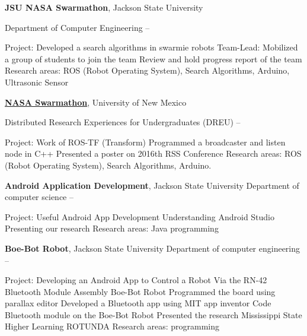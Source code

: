 \documentclass[letterpaper,10pt,oneside]{article}
\begin{document}
\begin{body}
{\textbf{ JSU NASA Swarmathon}}, Jackson State University

\GapNoBreak
\BulletItem
Department of Computer Engineering
\hfill
{} --
\begin{detail}
\SubBulletItem
Project:
Developed a search algorithms in swarmie robots
\SubBulletItem
Team-Lead: Mobilized a group of students to join the team
\SubBulletItem
Review and hold progress report of the team
\SubBulletItem
Research areas:
ROS (Robot Operating System), Search Algorithms, Arduino, Ultrasonic Sensor
\end{detail}

\href{http://nasaswarmathon.com/}
{\textbf{NASA Swarmathon}}, University of New Mexico

\GapNoBreak
\BulletItem
Distributed Research Experiences for Undergraduates
(DREU)
\hfill
{} --
\begin{detail}
\SubBulletItem
Project:
Work of ROS-TF (Transform) 
\SubBulletItem
Programmed a broadcaster and listen node in C++
\SubBulletItem
Presented a poster on 2016th RSS Conference 
\SubBulletItem
Research areas:
ROS (Robot Operating System), Search Algorithms, Arduino.
\end{detail}



{\textbf{Android Application Development}}, Jackson State University
\GapNoBreak
\BulletItem
Department of computer science
\hfill
{} --
\begin{detail}
\SubBulletItem
Project:
Useful Android App Development
\SubBulletItem
Understanding Android Studio
\SubBulletItem
Presenting our research
\SubBulletItem
Research areas:
Java programming
\end{detail}


{\textbf{Boe-Bot Robot}}, Jackson State University
\GapNoBreak
\BulletItem
Department of computer engineering
\hfill
{} --
\begin{detail}
\SubBulletItem
Project:
Developing an Android App to Control a Robot Via the RN-42 Bluetooth Module
\SubBulletItem
Assembly Boe-Bot Robot
\SubBulletItem
Programmed the board using parallax editor
\SubBulletItem
Developed a Bluetooth app using MIT app inventor
\SubBulletItem
Code Bluetooth module on the Boe-Bot Robot
\SubBulletItem
Presented the research Mississippi State Higher Learning ROTUNDA 
\SubBulletItem
Research areas:
programming
\end{detail}






\end{body}
\end{document}

